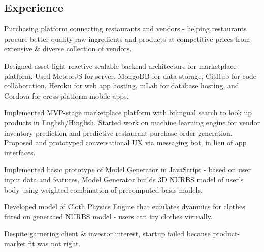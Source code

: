 \documentclass[]{deedy}
\begin{document}
\begin{minipage}[t]{0.72\textwidth}
\begin{flushleft}
\section{Experience}
\begin{tightemize}
\item Purchasing platform connecting restaurants and vendors - helping restaurants procure better quality raw ingredients and products at competitive prices from extensive \& diverse collection of vendors.
\item Designed asset-light reactive scalable backend architecture for marketplace platform. Used MeteorJS for server, MongoDB for data storage, GitHub for code collaboration, Heroku for web app hosting, mLab for database hosting, and Cordova for cross-platform mobile apps.
\item Implemented MVP-stage marketplace platform with bilingual search to look up products in English/Hinglish. Started work on machine learning engine for vendor inventory prediction and predictive restaurant purchase order generation. Proposed and prototyped conversational UX via messaging bot, in lieu of app interfaces.
\end{tightemize}
\sectionsep
%
\begin{tightemize}
\item Implemented basic prototype of Model Generator in JavaScript - based on user input data and features, Model Generator builds 3D NURBS model of user's body using weighted combination of precomputed basis models.
\item Developed model of Cloth Physics Engine that emulates dyanmics for clothes fitted on generated NURBS model - users can try clothes virtually.
\item Despite garnering client \& investor interest, startup failed because product-market fit was not right.
\end{tightemize}
\sectionsep
%
\end{flushleft}
\end{minipage}
%
\pagebreak
\end{document}
